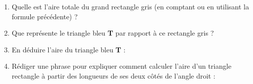 \documentclass[a4paper]{book}
\begin{document}
    
    \begin{exercice}
        \begin{center}
        \end{center}
        
        \begin{enumerate}
            \item Quelle est l'aire totale du grand rectangle gris (en comptant ou en utilisant la formule précédente) ? \points[3]
            \item Que représente le triangle bleu \textbf{T} par rapport à ce rectangle gris ? \points[4]
            \item En déduire l'aire du triangle bleu \textbf{T} : \points[4]
            \item Rédiger une phrase pour expliquer comment calculer l'aire d'un triangle rectangle à partir des longueurs de ses deux côtés de l'angle droit : \newline
        \end{enumerate}
    \end{exercice}
\end{document}
